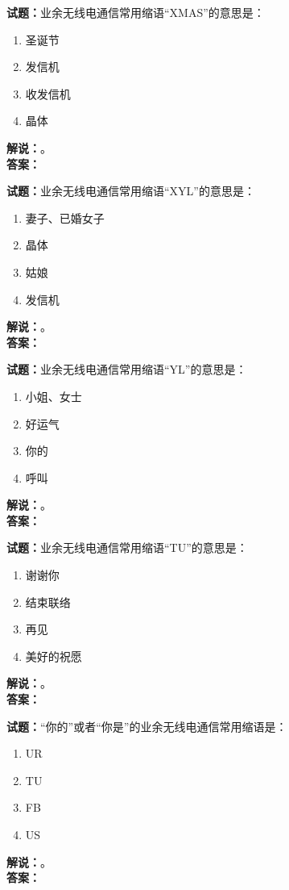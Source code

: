 \documentclass{ctexbook}
\begin{document}
\bigskip

\noindent\textbf{试题：}业余无线电通信常用缩语“XMAS”的意思是：
\begin{enumerate}[leftmargin=3em]
  \item 圣诞节
  \item 发信机
  \item 收发信机
  \item 晶体
\end{enumerate}
\noindent\textbf{解说：}\textbf{}。\\\noindent\textbf{答案：}

\bigskip

\noindent\textbf{试题：}业余无线电通信常用缩语“XYL”的意思是：
\begin{enumerate}[leftmargin=3em]
  \item 妻子、已婚女子
  \item 晶体
  \item 姑娘
  \item 发信机
\end{enumerate}
\noindent\textbf{解说：}\textbf{}。\\\noindent\textbf{答案：}

\bigskip

\noindent\textbf{试题：}业余无线电通信常用缩语“YL”的意思是：
\begin{enumerate}[leftmargin=3em]
  \item 小姐、女士
  \item 好运气
  \item 你的
  \item 呼叫
\end{enumerate}
\noindent\textbf{解说：}\textbf{}。\\\noindent\textbf{答案：}

\bigskip

\noindent\textbf{试题：}业余无线电通信常用缩语“TU”的意思是：
\begin{enumerate}[leftmargin=3em]
  \item 谢谢你
  \item 结束联络
  \item 再见
  \item 美好的祝愿
\end{enumerate}
\noindent\textbf{解说：}\textbf{}。\\\noindent\textbf{答案：}

\bigskip

\noindent\textbf{试题：}“你的”或者“你是”的业余无线电通信常用缩语是：
\begin{enumerate}[leftmargin=3em]
  \item UR
  \item TU
  \item FB
  \item US
\end{enumerate}
\noindent\textbf{解说：}\textbf{}。\\\noindent\textbf{答案：}
\end{document}
